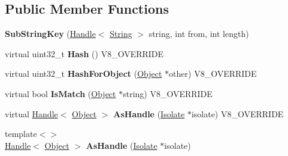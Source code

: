 \subsection*{Public Member Functions}
\begin{DoxyCompactItemize}
\item 
\hypertarget{classv8_1_1internal_1_1_sub_string_key_a5e323467d15097c545632594c4e503ca}{}{\bfseries Sub\+String\+Key} (\hyperlink{classv8_1_1internal_1_1_handle}{Handle}$<$ \hyperlink{classv8_1_1internal_1_1_string}{String} $>$ string, int from, int length)\label{classv8_1_1internal_1_1_sub_string_key_a5e323467d15097c545632594c4e503ca}

\item 
\hypertarget{classv8_1_1internal_1_1_sub_string_key_a1b0eb33cfb9d403d9b8d8bcbf6a9cf9e}{}virtual uint32\+\_\+t {\bfseries Hash} () V8\+\_\+\+O\+V\+E\+R\+R\+I\+D\+E\label{classv8_1_1internal_1_1_sub_string_key_a1b0eb33cfb9d403d9b8d8bcbf6a9cf9e}

\item 
\hypertarget{classv8_1_1internal_1_1_sub_string_key_afc4156f33de263e8b5778c7ba01856c3}{}virtual uint32\+\_\+t {\bfseries Hash\+For\+Object} (\hyperlink{classv8_1_1internal_1_1_object}{Object} $\ast$other) V8\+\_\+\+O\+V\+E\+R\+R\+I\+D\+E\label{classv8_1_1internal_1_1_sub_string_key_afc4156f33de263e8b5778c7ba01856c3}

\item 
\hypertarget{classv8_1_1internal_1_1_sub_string_key_a7785ca912d048c7aeea2d67ce8fcc8a9}{}virtual bool {\bfseries Is\+Match} (\hyperlink{classv8_1_1internal_1_1_object}{Object} $\ast$string) V8\+\_\+\+O\+V\+E\+R\+R\+I\+D\+E\label{classv8_1_1internal_1_1_sub_string_key_a7785ca912d048c7aeea2d67ce8fcc8a9}

\item 
\hypertarget{classv8_1_1internal_1_1_sub_string_key_ae01380af3d79aafa871780d4dde68084}{}virtual \hyperlink{classv8_1_1internal_1_1_handle}{Handle}$<$ \hyperlink{classv8_1_1internal_1_1_object}{Object} $>$ {\bfseries As\+Handle} (\hyperlink{classv8_1_1internal_1_1_isolate}{Isolate} $\ast$isolate) V8\+\_\+\+O\+V\+E\+R\+R\+I\+D\+E\label{classv8_1_1internal_1_1_sub_string_key_ae01380af3d79aafa871780d4dde68084}

\item 
\hypertarget{classv8_1_1internal_1_1_sub_string_key_a1e7f54ee931457b3b7eb47f2be0985c0}{}{\footnotesize template$<$$>$ }\\\hyperlink{classv8_1_1internal_1_1_handle}{Handle}$<$ \hyperlink{classv8_1_1internal_1_1_object}{Object} $>$ {\bfseries As\+Handle} (\hyperlink{classv8_1_1internal_1_1_isolate}{Isolate} $\ast$isolate)\label{classv8_1_1internal_1_1_sub_string_key_a1e7f54ee931457b3b7eb47f2be0985c0}


\end{DoxyCompactItemize}
